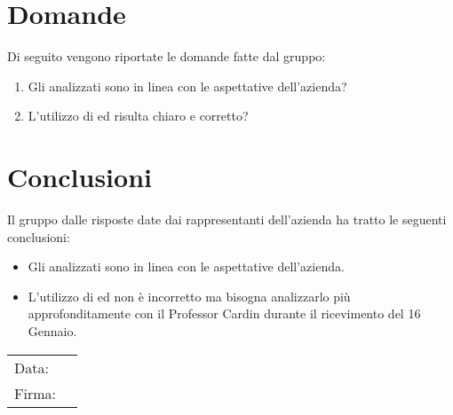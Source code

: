 \documentclass[a4paper, 12pt]{article}
\begin{document}
\newpage

\section{Domande}
\label{sec:Domande}
Di seguito vengono riportate le domande fatte dal gruppo:
\begin{enumerate}
    \item Gli  analizzati sono in linea con le aspettative dell'azienda?
    \item L'utilizzo di  ed  risulta chiaro e corretto?
\end{enumerate}
\section{Conclusioni}
\label{sec:Conclusioni}
Il gruppo dalle risposte date dai rappresentanti dell’azienda ha tratto le seguenti conclusioni:
\begin{itemize}
    \item Gli  analizzati sono in linea con le aspettative dell'azienda.
    \item L'utilizzo di  ed  non è incorretto ma bisogna analizzarlo più approfonditamente con il Professor Cardin durante il ricevimento del 16 Gennaio.
\end{itemize}
\vfill
{\renewcommand{\arraystretch}{2}
\begin{tabular}{l p{5cm}}
    Data: &  \hrulefill \\
    Firma: & \hrulefill \\
\end{tabular}
}
\end{document}
